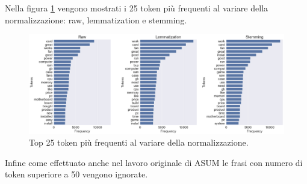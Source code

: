 
Nella figura \ref{fig:tokens} vengono mostrati i 25 token più frequenti al variare della normalizzazione: raw, lemmatization e stemming.

\begin{figure}[ht]
    \centering
    \includegraphics[width=\textwidth]{images/tokens}
    \caption{Top 25 token più frequenti al variare della normalizzazione.}
    \label{fig:tokens}
\end{figure}

Infine come effettuato anche nel lavoro originale di ASUM le frasi con numero di token superiore a 50 vengono ignorate.

